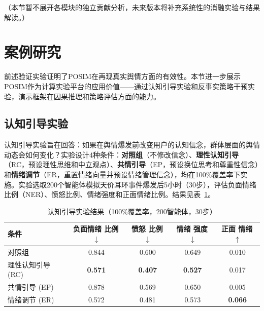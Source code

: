 \documentclass[lettersize,journal]{IEEEtran}
\newcommand{\best}[1]{\textbf{#1}}
\begin{document}
（本节暂不展开各模块的独立贡献分析，未来版本将补充系统性的消融实验与结果解读。）


\section{案例研究}
\label{sec:case}

前述验证实验证明了POSIM在再现真实舆情方面的有效性。本节进一步展示POSIM作为计算实验平台的应用价值——通过认知引导实验和反事实策略干预实验，演示框架在因果推理和策略评估方面的能力。

\subsection{认知引导实验}

认知引导实验旨在回答：如果在舆情爆发前改变用户的认知信念，群体层面的舆情动态会如何变化？实验设计4种条件：\textbf{对照组}（不修改信念）、\textbf{理性认知引导}（RC，预设理性思维和中立观点）、\textbf{共情引导}（EP，预设换位思考和尊重性信念）和\textbf{情绪调节}（ER，重置情绪向量并预设情绪管理信念），均在100\%覆盖率下实施。实验选取200个智能体模拟天价耳环事件爆发后5小时（30步），评估负面情绪比例（NER）、愤怒比例、情绪强度和正面情绪比例。结果见表~\ref{tab:priming}。

\begin{table}[!t]
\centering
\caption{认知引导实验结果（100\%覆盖率，200智能体，30步）}
\label{tab:priming}
\renewcommand{\arraystretch}{1.0}
\small
\begin{tabular}{@{}lcccc@{}}
\toprule
\textbf{条件} & \makecell{\textbf{负面情绪}\\\textbf{比例}\,$\downarrow$} & \makecell{\textbf{愤怒}\\\textbf{比例}\,$\downarrow$} & \makecell{\textbf{情绪}\\\textbf{强度}\,$\downarrow$} & \makecell{\textbf{正面}\\\textbf{情绪}\,$\uparrow$} \\
\midrule
对照组 & 0.844 & 0.600 & 0.649 & 0.010 \\
\rowcolor{orangerow}
理性认知引导 (RC) & \best{0.571} & \best{0.407} & \best{0.527} & 0.017 \\
\rowcolor{grayrow}
共情引导 (EP) & 0.878 & 0.569 & 0.650 & 0.005 \\
情绪调节 (ER) & 0.572 & 0.481 & 0.573 & \best{0.066} \\
\bottomrule
\end{tabular}
\end{table}
\end{document}
